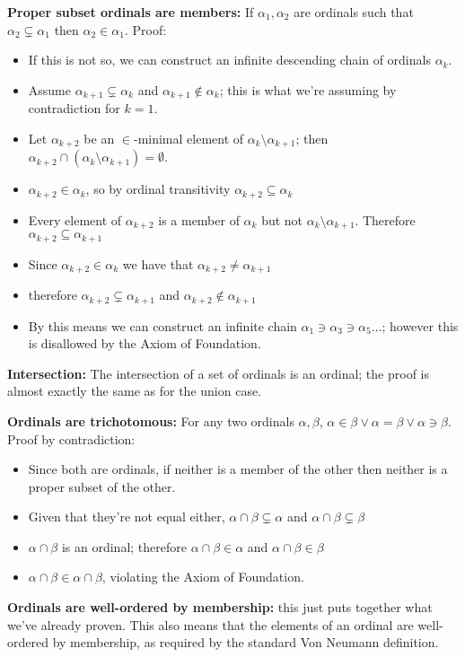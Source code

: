 \documentclass{article}
\begin{document}
\textbf{Proper subset ordinals are members:} If $\alpha_1, \alpha_2$ are ordinals such that $\alpha_2 \subsetneq \alpha_1$ then $\alpha_2 \in \alpha_1$. Proof: 
\begin{itemize}
\item If this is not so, we can construct an infinite descending chain of ordinals $\alpha_k$.
\item Assume $\alpha_{k+1} \subsetneq \alpha_k$ and $\alpha_{k+1} \not\in \alpha_k$; this is what we're assuming by contradiction for $k=1$.
\item Let $\alpha_{k+2}$ be an $\in$-minimal element of $\alpha_k \setminus \alpha_{k+1}$; then $\alpha_{k+2} \cap (\alpha_k \setminus \alpha_{k+1}) = \emptyset$.
\item $\alpha_{k+2} \in \alpha_k$, so by ordinal transitivity $\alpha_{k+2} \subseteq \alpha_k$ 
\item Every element of $\alpha_{k+2}$ is a member of $\alpha_k$ but not $\alpha_k \setminus \alpha_{k+1}$. Therefore $\alpha_{k+2} \subseteq \alpha_{k+1}$
\item Since $\alpha_{k+2} \in \alpha_k$ we have that $\alpha_{k+2} \neq \alpha_{k+1}$
\item therefore $\alpha_{k+2} \subsetneq \alpha_{k+1}$ and $\alpha_{k+2} \not\in \alpha_{k+1}$
\item By this means we can construct an infinite chain $\alpha_1 \ni \alpha_3 \ni \alpha_5 \ldots$; however this is disallowed by the Axiom of Foundation.
\end{itemize}

\textbf{Intersection:} The intersection of a set of ordinals is an ordinal; the proof is almost exactly the same as for the union case.

\textbf{Ordinals are trichotomous:} For any two ordinals $\alpha, \beta$, $\alpha \in \beta \vee \alpha = \beta \vee \alpha \ni \beta$. Proof by contradiction: 
\begin{itemize}
\item Since both are ordinals, if neither is a member of the other then neither is a proper subset of the other.
\item Given that they're not equal either, $\alpha \cap \beta \subsetneq \alpha$ and $\alpha \cap \beta \subsetneq \beta$
\item $\alpha \cap \beta$ is an ordinal; therefore $\alpha \cap \beta \in \alpha$ and $\alpha \cap \beta \in \beta$
\item $\alpha \cap \beta \in \alpha \cap \beta$, violating the Axiom of Foundation.
\end{itemize}

\textbf{Ordinals are well-ordered by membership:} this just puts together what we've already proven. This also means that the elements of an ordinal are well-ordered by membership, as required by the standard Von Neumann definition.
\end{document}
